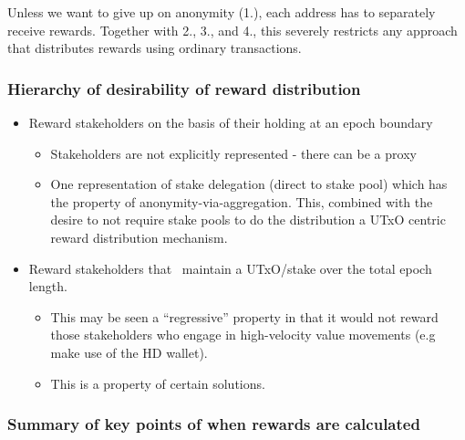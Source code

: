 \documentclass[11pt,a4paper,dvipsnames,twosided]{article}
\begin{document}
Unless we want to give up on anonymity (1.), each address has to
separately receive rewards. Together with 2., 3., and 4., this severely
restricts any approach that distributes rewards using ordinary
transactions.

\subsubsection{Hierarchy of desirability of reward distribution}
\label{hierarchy-of-desirability-of-reward-distribution}

\begin{itemize}
\item
  Reward stakeholders on the basis of their holding at an epoch boundary

  \begin{itemize}
  \item
    Stakeholders are not explicitly represented - there can be a proxy
  \item
    One representation of stake delegation (direct to stake pool) which
    has the property of anonymity-via-aggregation. This, combined with
    the desire to not require stake pools to do the distribution a UTxO
    centric reward distribution mechanism.
  \end{itemize}
\item
  Reward stakeholders that ~maintain a UTxO/stake over the total epoch
  length.

  \begin{itemize}
  \item
    This may be seen a ``regressive'' property in that it would not
    reward those stakeholders who engage in high-velocity value
    movements (e.g make use of the HD wallet).
  \item
    This is a property of certain solutions.
  \end{itemize}
\end{itemize}

\subsubsection{Summary of key points of when rewards are calculated}
\label{summary-of-key-points-of-when-rewards-are-calculated}
\end{document}
